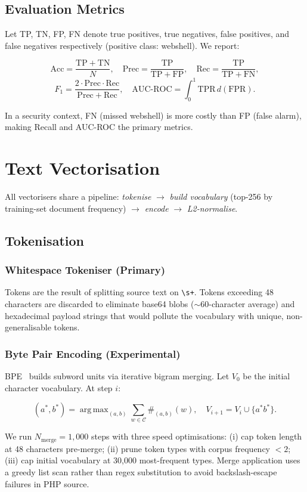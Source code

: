 \documentclass[10pt,conference,letterpaper]{IEEEtran}
\DeclareMathOperator*{\argmax}{arg\,max}
\begin{document}
\subsection{Evaluation Metrics}

Let TP, TN, FP, FN denote true positives, true negatives, false positives, and
false negatives respectively (positive class: webshell). We report:
\begin{tcolorbox}[eqbox]
\[
  \mathrm{Acc}     = \frac{\mathrm{TP}+\mathrm{TN}}{N},\quad
  \mathrm{Prec}    = \frac{\mathrm{TP}}{\mathrm{TP}+\mathrm{FP}},\quad
  \mathrm{Rec}     = \frac{\mathrm{TP}}{\mathrm{TP}+\mathrm{FN}},
\]
\[
  F_1              = \frac{2\cdot\mathrm{Prec}\cdot\mathrm{Rec}}{\mathrm{Prec}+\mathrm{Rec}},\quad
  \mathrm{AUC\text{-}ROC} = \int_0^1 \mathrm{TPR}\,d(\mathrm{FPR}).
\]
\end{tcolorbox}

In a security context, FN (missed webshell) is more costly than FP (false alarm),
making Recall and AUC-ROC the primary metrics.

\section{Text Vectorisation}
\label{sec:vec}

All vectorisers share a pipeline: \emph{tokenise} $\to$
\emph{build vocabulary} (top-256 by training-set document frequency) $\to$
\emph{encode} $\to$ \emph{L2-normalise}.

\subsection{Tokenisation}

\subsubsection{Whitespace Tokeniser (Primary)}
Tokens are the result of splitting source text on \verb|\s+|. Tokens exceeding
48 characters are discarded to eliminate base64 blobs ($\sim$60-character average)
and hexadecimal payload strings that would pollute the vocabulary with unique,
non-generalisable tokens.

\subsubsection{Byte Pair Encoding (Experimental)}
BPE~\cite{sennrich2016bpe} builds subword units via iterative bigram merging.
Let $V_0$ be the initial character vocabulary. At step $i$:
\begin{tcolorbox}[eqbox]
\[
  (a^*,b^*) = \argmax_{(a,b)}\sum_{w\in\mathcal{C}}\#_{(a,b)}(w),
  \quad V_{i+1} = V_i \cup \{a^*b^*\}.
\]
\end{tcolorbox}
We run $N_\text{merge}=1{,}000$ steps with three speed optimisations: (i) cap token
length at 48 characters pre-merge; (ii) prune token types with corpus frequency
$<2$; (iii) cap initial vocabulary at 30{,}000 most-frequent types. Merge
application uses a greedy list scan rather than regex substitution to avoid
backslash-escape failures in PHP source.
\end{document}
